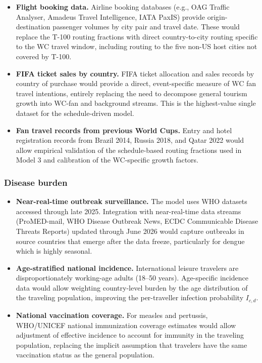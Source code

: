 \documentclass[12pt]{article}
\begin{document}
\begin{itemize}

  \item \textbf{Flight booking data.}
  Airline booking databases (e.g., OAG Traffic Analyser, Amadeus Travel
  Intelligence, IATA PaxIS) provide origin-destination passenger volumes
  by city pair and travel date. These would replace the T-100 routing
  fractions with direct country-to-city routing specific to the WC travel
  window, including routing to the five non-US host cities not covered
  by T-100.

  \item \textbf{FIFA ticket sales by country.}
  FIFA ticket allocation and sales records by country of purchase would
  provide a direct, event-specific measure of WC fan travel intentions,
  entirely replacing the need to decompose general tourism growth into
  WC-fan and background streams. This is the highest-value single dataset
  for the schedule-driven model.

  \item \textbf{Fan travel records from previous World Cups.}
  Entry and hotel registration records from Brazil 2014, Russia 2018, and
  Qatar 2022 would allow empirical validation of the schedule-based
  routing fractions used in Model 3 and calibration of the WC-specific
  growth factors.

\end{itemize}

\subsubsection*{Disease burden}

\begin{itemize}

  \item \textbf{Near-real-time outbreak surveillance.}
  The model uses WHO datasets accessed through late 2025. Integration
  with near-real-time data streams (ProMED-mail, WHO Disease Outbreak
  News, ECDC Communicable Disease Threats Reports) updated through
  June 2026 would capture outbreaks in source countries that emerge
  after the data freeze, particularly for dengue which is highly
  seasonal.

  \item \textbf{Age-stratified national incidence.}
  International leisure travelers are disproportionately working-age
  adults (18--50 years). Age-specific incidence data would allow
  weighting country-level burden by the age distribution of the
  traveling population, improving the per-traveller infection
  probability $I_{c,d}$.

  \item \textbf{National vaccination coverage.}
  For measles and pertussis, WHO/UNICEF national immunization coverage
  estimates would allow adjustment of effective incidence to account
  for immunity in the traveling population, replacing the implicit
  assumption that travelers have the same vaccination status as the
  general population.

\end{itemize}
\end{document}
